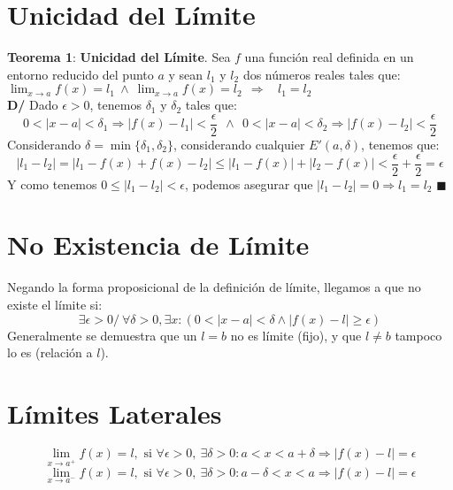 \documentclass[11pt,a4paper]{article}
\newcommand*{\QEDA}{\null\nobreak\hfill\ensuremath{\blacksquare}}
\begin{document}
\section{Unicidad del L\'imite}
\noindent \textbf{Teorema 1}: \textbf{Unicidad del L\'imite}. Sea $f$ una funci\'on real definida en un entorno reducido del punto $a$ y sean $l_1$ y $l_2$ dos n\'umeros reales tales que: \ \ $\displaystyle{\lim_{x\to a}f(x)=l_1} \ \land \ \displaystyle{\lim_{x\to a}f(x)=l_2} \ \ \Rightarrow \ \ \ \ l_1 = l_2$\\
\textbf{D/} Dado $\epsilon > 0$, tenemos $\delta_1$ y $\delta_2$ tales que: $$0 < |x-a| < \delta_1 \Rightarrow |f(x) - l_1| < \dfrac{\epsilon}{2} \ \ \land \ \ 0 < |x-a| < \delta_2 \Rightarrow |f(x) - l_2| < \dfrac{\epsilon}{2}$$
Considerando $\delta = \min\{\delta_1, \delta_2\}$, considerando cualquier $E'(a, \delta)$, tenemos que:
$$|l_1 - l_2| = |l_1 - f(x) + f(x) - l_2| \leq |l_1 - f(x)| + |l_2 - f(x)| < \dfrac{\epsilon}{2} + \dfrac{\epsilon}{2} = \epsilon$$
Y como tenemos $0 \leq |l_1 - l_2| < \epsilon$, podemos asegurar que $|l_1 - l_2| = 0 \Rightarrow l_1 = l_2$ \QEDA

\section{No Existencia de L\'imite}
Negando la forma proposicional de la definici\'on de l\'imite, llegamos a que no existe el l\'imite si: $$\exists \epsilon > 0 /\ \forall \delta > 0, \exists x: (0< |x-a| < \delta \land |f(x) - l| \geq \epsilon)$$
Generalmente se demuestra que un $l=b$ no es l\'imite (fijo), y que $l \not = b$ tampoco lo es (relaci\'on a $l$).

\section{L\'imites Laterales}
$$\lim_{x \to a^+} f(x) = l, \text{ si } \forall \epsilon > 0,\ \exists \delta > 0: a < x < a+\delta \Rightarrow |f(x)-l| = \epsilon$$
$$\lim_{x \to a^-} f(x) = l, \text{ si } \forall \epsilon > 0,\ \exists \delta > 0: a-\delta < x < a \Rightarrow |f(x)-l| = \epsilon$$\\
\end{document}
